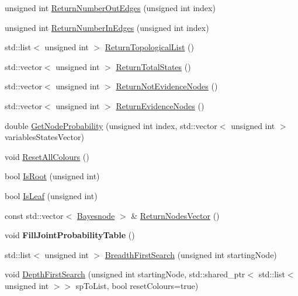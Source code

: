 \begin{DoxyCompactItemize}
\item 
unsigned int \hyperlink{classbayonet_1_1_bayesnet_aae9de07f181dc75f309b7f59e302a947}{Return\-Number\-Out\-Edges} (unsigned int index)
\item 
unsigned int \hyperlink{classbayonet_1_1_bayesnet_a7d47ce38f3882b80121f6acc351fd373}{Return\-Number\-In\-Edges} (unsigned int index)
\item 
std\-::list$<$ unsigned int $>$ \hyperlink{classbayonet_1_1_bayesnet_a3e8e924c33186e72bfa7d8ace1c211e6}{Return\-Topological\-List} ()
\item 
std\-::vector$<$ unsigned int $>$ \hyperlink{classbayonet_1_1_bayesnet_af05513604bc2273f64abd7e685d1d636}{Return\-Total\-States} ()
\item 
std\-::vector$<$ unsigned int $>$ \hyperlink{classbayonet_1_1_bayesnet_ac9f389cd6382946deb5b04cb6513f11e}{Return\-Not\-Evidence\-Nodes} ()
\item 
std\-::vector$<$ unsigned int $>$ \hyperlink{classbayonet_1_1_bayesnet_a8610f2ec52297edfe6bf2151d2ce002c}{Return\-Evidence\-Nodes} ()
\item 
double \hyperlink{classbayonet_1_1_bayesnet_a0140ea4f620f852b12746f2a92bd4013}{Get\-Node\-Probability} (unsigned int index, std\-::vector$<$ unsigned int $>$ variables\-States\-Vector)
\item 
void \hyperlink{classbayonet_1_1_bayesnet_a2a934ac59da3a02720c40515b6b599e7}{Reset\-All\-Colours} ()
\item 
bool \hyperlink{classbayonet_1_1_bayesnet_a5877478cf225ed47f43df29cc087c5d6}{Is\-Root} (unsigned int)
\item 
bool \hyperlink{classbayonet_1_1_bayesnet_af9809dc12e3f77859f9674ced08fe7b0}{Is\-Leaf} (unsigned int)
\item 
const std\-::vector$<$ \hyperlink{classbayonet_1_1_bayesnode}{Bayesnode} $>$ \& \hyperlink{classbayonet_1_1_bayesnet_a7b349d82edb61c0c982bb4b1240912da}{Return\-Nodes\-Vector} ()
\item 
\hypertarget{classbayonet_1_1_bayesnet_a586e4951a91ac2c47d8448caea25d657}{void {\bfseries Fill\-Joint\-Probability\-Table} ()}\label{classbayonet_1_1_bayesnet_a586e4951a91ac2c47d8448caea25d657}

\item 
std\-::list$<$ unsigned int $>$ \hyperlink{classbayonet_1_1_bayesnet_adef5210316c514cd50e977d5bc6292e5}{Breadth\-First\-Search} (unsigned int starting\-Node)
\item 
void \hyperlink{classbayonet_1_1_bayesnet_a8ab753ba22b35727cce998e2266b9afe}{Depth\-First\-Search} (unsigned int starting\-Node, std\-::shared\-\_\-ptr$<$ std\-::list$<$ unsigned int $>$$>$ sp\-To\-List, bool reset\-Colours=true)
\end{DoxyCompactItemize}


